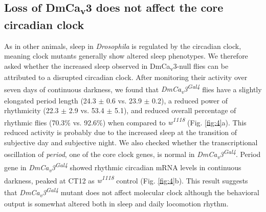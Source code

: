 \subsection*{Loss of DmCa\textsubscript{v}3 does not affect the core circadian clock}

As in other animals, sleep in \emph{Drosophila} is regulated by the circadian clock, meaning clock mutants generally show altered sleep phenotypes\cite{hendricks:2003aa, parisky:2008aa}.
We therefore asked whether the increased sleep observed in DmCa\textsubscript{v}3-null flies can be attributed to a disrupted circadian clock.
After monitoring their activity over seven days of continuous darkness, we found that \emph{DmCa\textsubscript{v}3\textsuperscript{Gal4}} flies have a slightly elongated period length (24.3 $\pm$ 0.6 vs. 23.9 $\pm$ 0.2), a reduced power of rhythmicity (22.3 $\pm$ 2.9 vs. 53.4 $\pm$ 5.1), and reduced overall percentage of rhythmic flies (70.3\% vs. 92.6\%) when compared to \emph{w\textsuperscript{1118}} (Fig. \ref{fig:4}a).
This reduced activity is probably due to the increased sleep at the transition of subjective day and subjective night.
We also checked whether the transcriptional oscillation of \emph{period}, one of the core clock genes, is normal in \emph{DmCa\textsubscript{v}3\textsuperscript{Gal4}}. 
Period gene in \emph{DmCa\textsubscript{v}3\textsuperscript{Gal4}} showed rhythmic circadian mRNA levels in continuous darkness, peaked at CT12 as \emph{w\textsuperscript{1118}} control (Fig. \ref{fig:4}b).
This result suggests that \emph{DmCa\textsubscript{v}3\textsuperscript{Gal4}} mutant does not affect molecular clock although the behavioral output is somewhat altered both in sleep and daily locomotion rhythm. 


  
  